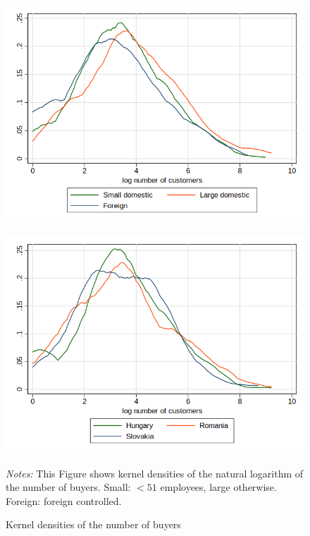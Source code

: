 \documentclass[final, dvipsnames, authoryear,12pt]{elsarticle}
\begin{document}
\begin{figure}[h]    
    \begin{center}
    \caption{Kernel densities of the number of buyers}
    \label{fig:kernel}       
    \begin{subfloat}
    {\includegraphics[scale=0.5]{graphs/Fig5a.png}}
    \end{subfloat}
    \begin{subfloat}[By country]
    {\includegraphics[scale=0.5]{graphs/Fig5b.png}}
    \end{subfloat}
    \end{center}
    {\footnotesize \textit{Notes:} This Figure shows kernel densities of the natural logarithm of the number of buyers. Small: $< 51$ employees, large otherwise. Foreign: foreign controlled.}
\end{figure}
\end{document}
